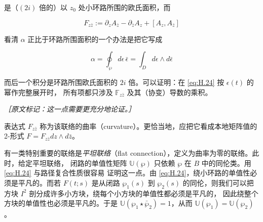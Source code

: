 是（$(2i)$ 倍的）以 $z_0$ 处小环路所围的欧氏面积，而

\begin{equation}
  F_{z\bar z} := \partial_z A_{\bar z} - \partial_{\bar z}A_z + [A_z,A_{\bar z}]
  \tag{H.26}
  \label{eq:H.26}
\end{equation}

看清 $\alpha$ 正比于环路所围面积的一个办法是把它写成

\begin{equation}
  \alpha = \oint_\wp d\epsilon\,\bar{\epsilon} = \int_D d\epsilon\wedge d\bar{\epsilon}
  \tag{H.27}
  \label{eq:H.27}
\end{equation}

而后一个积分是环路所围欧氏面积的 $2i$ 倍。可以证明：在 \eqref{eq:H.24} 按 $\epsilon(t)$ 的幂作完整展开时，
所有项都只涉及 $\mathbb{F}_{z\bar z}$ 及其（协变）导数的乘积。



{\small\itshape ［原文标记：这一点需要更充分地论证。］}


表达式 $F_{z\bar z}$ 称为该联络的曲率（curvature）。更恰当地，应把它看成本地矩阵值的 2-形式
$F=F_{z\bar z}dz\wedge d\bar z$。

有一类特别重要的联络是\emph{平坦联络}（flat connection），定义为曲率为零的联络。此时，给定平坦联络，
闭路的单值性矩阵 $\mathbb{U}(\wp)$ 只依赖 $\wp$ 在 $B$ 中的同伦类。用 \eqref{eq:H.24} 与路径复合性质很容易
证明这一点。由 \eqref{eq:H.24}，绕小环路的单值性必须是平凡的。而若 $F(t;s)$ 是从闭路 $\wp_1(s)$ 到
$\wp_2(s)$ 的同伦，则我们可以把方块 $I^2$ 剖分成许多小方块，绕每个小方块的单值性都必须是平凡的，
因此绕整个方块的单值性也必须是平凡的。于是 $\mathbb{U}(\wp_1\star\bar{\wp}_2)=1$，从而
$\mathbb{U}(\wp_1)=\mathbb{U}(\wp_2)$。

